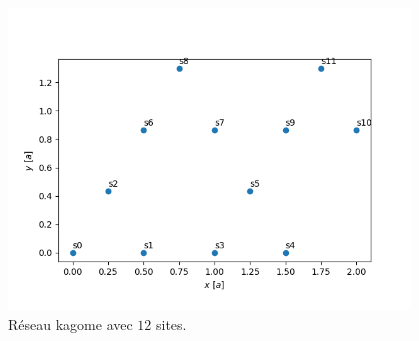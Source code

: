 


    \begin{figure}[h]
        \begin{center}
            \includegraphics[width=0.95\textwidth]{../figs/reskagome.png}
        \end{center}
        \caption{Réseau kagome avec $12$ sites.}
        \label{fig:kagome}
    \end{figure}

